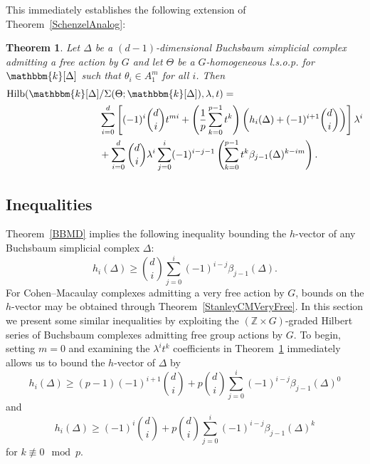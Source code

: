 \documentclass[10pt]{amsart}
\newtheorem{theo}{Theorem}[section]
\theoremstyle{definition}
\DeclareMathOperator{\Hilb}{Hilb}
\newcommand{\field}{\mathbbm{k}}
\newcommand{\ZZ}{{\mathbb Z}}
\begin{document}
This immediately establishes the following extension of Theorem~\ref{SchenzelAnalog}:

\begin{theo}\label{SigmaModuleThm}
Let $\Delta$ be a $(d-1)$-dimensional Buchsbaum simplicial complex admitting a free action by $G$ and let $\Theta$ be a $G$-homogeneous l.s.o.p. for $\field[\Delta]$ such that $\theta_i\in A_1^m$ for all $i$. Then
\begin{align*}
\Hilb(\field[\Delta]&/\Sigma(\Theta;\field[\Delta]), \lambda, t)=\\
&\sum_{i=0}^d\left[(-1)^i\binom{d}{i}t^{mi}+\left(\frac{1}{p}\sum_{k=0}^{p-1}t^k\right)\left(h_i(\Delta)+(-1)^{i+1}\binom{d}{i}\right)\right]\lambda^i\\
&+\sum_{i=0}^d\binom{d}{i}\lambda^i\sum_{j=0}^{i}(-1)^{i-j-1}\left(\sum_{k=0}^{p-1}t^k\beta_{j-1}(\Delta)^{k-im} \right).
\end{align*}
\end{theo}



\subsection{Inequalities}\label{Inequalities}
Theorem~\ref{BBMD} implies the following inequality bounding the $h$-vector of any Buchsbaum simplicial complex $\Delta$:
\begin{equation}\label{buchsbaumInequality}
h_i(\Delta)\ge \binom{d}{i}\sum_{j=0}^i(-1)^{i-j}\beta_{j-1}(\Delta).
\end{equation}
For Cohen--Macaulay complexes admitting a very free action by $G$, bounds on the $h$-vector may be obtained through Theorem~\ref{StanleyCMVeryFree}. In this section we present some similar inequalities by exploiting the $(\ZZ\times G)$-graded Hilbert series of Buchsbaum complexes admitting free group actions by $G$. To begin, setting $m=0$ and examining the $\lambda^it^{k}$ coefficients in Theorem~\ref{SigmaModuleThm} immediately allows us to bound the $h$-vector of $\Delta$ by
\begin{equation}\label{zeropart}
h_i(\Delta)\ge(p-1)(-1)^{i+1}\binom{d}{i}+p\binom{d}{i}\sum_{j=0}^i(-1)^{i-j}\beta_{j-1}(\Delta)^0
\end{equation}
and
\begin{equation}\label{nonzeropart}
h_i(\Delta)\ge(-1)^{i}\binom{d}{i}+p\binom{d}{i}\sum_{j=0}^i(-1)^{i-j}\beta_{j-1}(\Delta)^k
\end{equation}
for $k\not\equiv 0 \mod p$.
\end{document}
